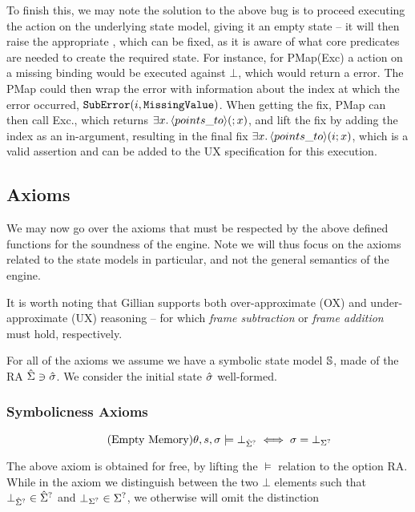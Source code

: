 To finish this, we may note the solution to the above bug is to proceed executing the action on the underlying state model, giving it an empty state -- it will then raise the appropriate \Miss{}, which can be fixed, as it is aware of what core predicates are needed to create the required state. For instance, for PMap(Exc) a  action on a missing binding would be executed against $\bot$, which would return a  error. The PMap could then wrap the error with information about the index at which the error occurred, $\texttt{SubError}(i, \texttt{MissingValue})$. When getting the fix, PMap can then call Exc.\fix, which returns $\exists x\ldotp \left<points\_to\right>\!(;x)$, and lift the fix by adding the index as an in-argument, resulting in the final fix $\exists x\ldotp\left<points\_to\right>\!(i;x)$, which is a valid assertion and can be added to the UX specification for this execution.

\subsection{Axioms}

We may now go over the axioms that must be respected by the above defined functions for the soundness of the engine. Note we will thus focus on the axioms related to the state models in particular, and not the general semantics of the engine.

It is worth noting that Gillian supports both over-approximate (OX) and under-approximate (UX) reasoning -- for which \emph{frame subtraction} or \emph{frame addition} must hold, respectively.

For all of the axioms we assume we have a symbolic state model $\mathbb S$, made of the RA $\hat{\Sigma} \ni \hat{\sigma}$. We consider the initial state $\hat{\sigma}$ well-formed.

\subsubsection{Symbolicness Axioms }

\begin{equation}
\tag{Empty Memory}\label{eq:empty-mem}
\theta,s,\sigma\models \bot_{\hat{\Sigma}^?} \iff \sigma = \bot_{\Sigma^?}
\end{equation}

The above axiom is obtained for free, by lifting the $\models$ relation to the option RA. While in the axiom we distinguish between the two $\bot$ elements such that $\bot_{\hat{\Sigma}^?}\in\hat{\Sigma}^?$ and $\bot_{\Sigma^?}\in\Sigma^?$, we otherwise will omit the distinction 

